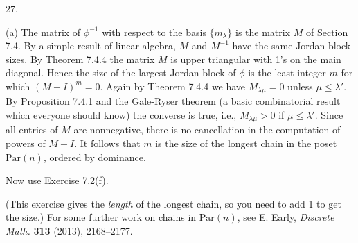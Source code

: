 27.

(a) The matrix of $\phi^{-1}$ with respect to the basis $\{m_\lambda\}$ is the matrix $M$ of Section 7.4. By a simple result of linear algebra, $M$ and $M^{-1}$ have the same Jordan block sizes. By Theorem 7.4.4 the matrix $M$ is upper triangular with 1's on the main diagonal. Hence the size of the largest Jordan block of $\phi$ is the least integer $m$ for which $(M-I)^m=0$. Again by Theorem 7.4.4 we have $M_{\lambda\mu}=0$ unless $\mu\le\lambda'$. By Proposition 7.4.1 and the Gale-Ryser theorem (a basic combinatorial result which everyone should know) the converse is true, i.e., $M_{\lambda\mu}>0$ if $\mu\le\lambda'$. Since all entries of $M$ are nonnegative, there is no cancellation in the computation of powers of $M-I$. It follows that $m$ is the size of the longest chain in the poset $\mathrm{Par}(n)$, ordered by dominance.

Now use Exercise 7.2(f).

(This exercise gives the \emph{length} of the longest chain, so you need to add 1 to get the size.) For some further work on chains in $\mathrm{Par}(n)$, see E. Early, \textit{Discrete Math.} \textbf{313} (2013), 2168--2177.
